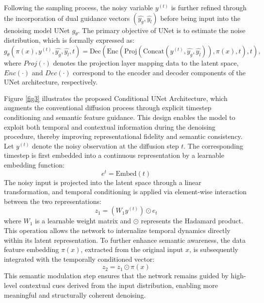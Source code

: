 \documentclass[a4paper,fleqn]{cas-sc}
\begin{document}
Following the sampling process, the noisy variable \( y^{(t)} \) is further refined through the incorporation of dual guidance vectors \( (\hat{y_g}, \hat{y_l}) \) before being input into the denoising model UNet \( g_{\theta} \). The primary objective of UNet is to estimate the noise distribution, which is formally expressed as:  
\begin{equation}
    g_{\theta}(\pi(x), y^{(t)}, \hat{y_g}, \hat{y_l}, t) = \text{Dec}\left(\text{Enc}\left(\text{Proj}\left(\text{Concat}\left(y^{(t)}, \hat{y_g}, \hat{y_l}\right)\right), \pi\left(x\right), t\right), t\right),
\end{equation}
where \( Proj(\cdot) \) denotes the projection layer mapping data to the latent space, \( Enc(\cdot) \) and \( Dec(\cdot) \) correspond to the encoder and decoder components of the UNet architecture, respectively.  

Figure \ref{fig3} illustrates the proposed Conditional UNet Architecture, which augments the conventional diffusion process through explicit timestep conditioning and semantic feature guidance. This design enables the model to exploit both temporal and contextual information during the denoising procedure, thereby improving representational fidelity and semantic consistency. Let $y^{(t)}$ denote the noisy observation at the diffusion step $t$. The corresponding timestep is first embedded into a continuous representation by a learnable embedding function:
\begin{equation}
    e^t=\text{Embed}(t)
\end{equation}
The noisy input is projected into the latent space through a linear transformation, and temporal conditioning is applied via element-wise interaction between the two representations:
\begin{equation}
    z_1=\left(W_1y^{(t)}\right)\odot e_t
\end{equation}
where $W_1$ is a learnable weight matrix and $\odot$ represents the Hadamard product. This operation allows the network to internalize temporal dynamics directly within its latent representation. To further enhance semantic awareness, the data feature embedding $\pi(x)$, extracted from the original input $x$, is subsequently integrated with the temporally conditioned vector:
\begin{equation}
    z_2 = z_1\odot \pi(x)
\end{equation}
This semantic modulation step ensures that the network remains guided by high-level contextual cues derived from the input distribution, enabling more meaningful and structurally coherent denoising.
\end{document}

